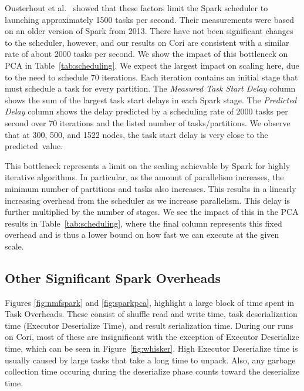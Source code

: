 Ousterhout et al.~\cite{Ousterhout13Sparrow} showed that these factors limit the Spark scheduler to launching approximately 1500 tasks per second.  Their measurements were based on an older version of Spark from 2013.  There have not been significant changes to the scheduler, however, and our results on Cori are consistent with a similar rate of about 2000 tasks per second.  We show the impact of this bottleneck on PCA in Table~\ref{tab:scheduling}.  
We expect the largest impact on scaling here, due to the need to schedule 70 iterations.  Each iteration contains an initial stage that must schedule a task for every partition.  The \emph{Measured Task Start Delay} column shows the sum of the largest task start delays in each Spark stage.  The \emph{Predicted Delay} column shows the delay predicted by a scheduling rate of 2000 tasks per second over 70 iterations and the listed number of tasks/partitions.  We observe that at 300, 500, and 1522 nodes, the task start delay is very close to the predicted~value.%

This bottleneck represents a limit on the scaling achievable by Spark for highly iterative algorithms.  In particular, as the amount of parallelism increases, the minimum number of partitions and tasks also increases.  This results in a linearly increasing overhead from the scheduler as we increase parallelism.  This delay is further multiplied by the number of stages.  We see the impact of this in the PCA results in Table~\ref{tab:scheduling}, where the final column represents this fixed overhead and is thus a lower bound on how fast we can execute at the given scale.  
\subsection{Other Significant Spark Overheads}
Figures \ref{fig:nmfspark} and \ref{fig:sparkpca}, highlight a large block of time spent in Task Overheads. These consist of  shuffle read and write time, task deserialization time (Executor Deserialize Time), and result serialization time.  During our runs on Cori, most of these are insignificant with the exception of Executor Deserialize time, which can be seen in  Figure~\ref{fig:whisker}.  High Executor Deserialize time is usually caused by large tasks that take a long time to unpack. Also, any garbage collection time occuring during the deserialize phase counts toward the deserialize time.
